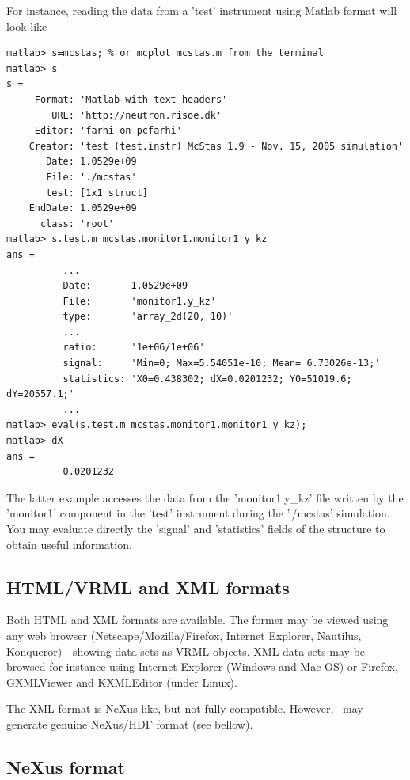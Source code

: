 For instance, reading the data from a 'test' instrument using Matlab format will
look like
\begin{verbatim}
matlab> s=mcstas; % or mcplot mcstas.m from the terminal
matlab> s
s =
     Format: 'Matlab with text headers'
        URL: 'http://neutron.risoe.dk'
     Editor: 'farhi on pcfarhi'
    Creator: 'test (test.instr) McStas 1.9 - Nov. 15, 2005 simulation'
       Date: 1.0529e+09
       File: './mcstas'
       test: [1x1 struct]
    EndDate: 1.0529e+09
      class: 'root'
matlab> s.test.m_mcstas.monitor1.monitor1_y_kz
ans =
          ...
          Date:       1.0529e+09
          File:       'monitor1.y_kz'
          type:       'array_2d(20, 10)'
          ...
          ratio:      '1e+06/1e+06'
          signal:     'Min=0; Max=5.54051e-10; Mean= 6.73026e-13;'
          statistics: 'X0=0.438302; dX=0.0201232; Y0=51019.6; dY=20557.1;'
          ...
matlab> eval(s.test.m_mcstas.monitor1.monitor1_y_kz);
matlab> dX
ans =
          0.0201232
\end{verbatim}
The latter example accesses the data from the 'monitor1.y\_kz' file written by
the 'monitor1' component in the 'test' instrument during the './mcstas'
simulation. You may evaluate directly the 'signal' and 'statistics' fields of
the structure to obtain useful information.

\subsection{HTML/VRML and XML formats}
  

Both HTML and XML formats are available. The former may be viewed using any web
browser (Netscape/Mozilla/Firefox, Internet Explorer, Nautilus, Konqueror) -
showing data sets as VRML objects. XML data sets may be browsed for instance
using Internet Explorer (Windows and Mac OS) or Firefox, GXMLViewer and
KXMLEditor (under Linux).

The XML format is NeXus-like, but not fully compatible. However, \MCS\ may
generate genuine NeXus/HDF format (see bellow).

\subsection{NeXus format}
  
\label{r:nexus}

